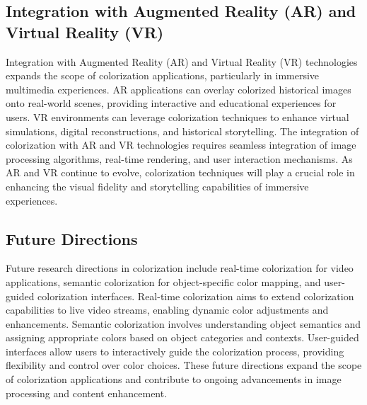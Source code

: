 \subsection*{Integration with Augmented Reality (AR) and Virtual Reality (VR)}

Integration with Augmented Reality (AR) and Virtual Reality (VR) technologies expands the scope of colorization applications, particularly in immersive multimedia experiences. AR applications can overlay colorized historical images onto real-world scenes, providing interactive and educational experiences for users. VR environments can leverage colorization techniques to enhance virtual simulations, digital reconstructions, and historical storytelling. The integration of colorization with AR and VR technologies requires seamless integration of image processing algorithms, real-time rendering, and user interaction mechanisms. As AR and VR continue to evolve, colorization techniques will play a crucial role in enhancing the visual fidelity and storytelling capabilities of immersive experiences.

\subsection*{Future Directions}

Future research directions in colorization include real-time colorization for video applications, semantic colorization for object-specific color mapping, and user-guided colorization interfaces. Real-time colorization aims to extend colorization capabilities to live video streams, enabling dynamic color adjustments and enhancements. Semantic colorization involves understanding object semantics and assigning appropriate colors based on object categories and contexts. User-guided interfaces allow users to interactively guide the colorization process, providing flexibility and control over color choices. These future directions expand the scope of colorization applications and contribute to ongoing advancements in image processing and content enhancement.